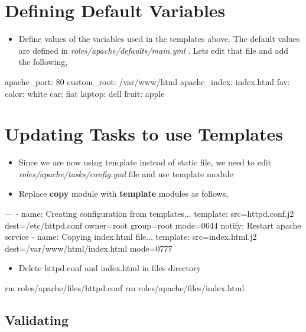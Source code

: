 \section{Defining Default Variables}

\begin{itemize}
\item Define values of the variables used in the templates above.  The default values are defined in \emph{roles/apache/defaults/main.yml} . Lets edit that file and add the following,
\end{itemize}

\begin{code}
apache_port: 80
custom_root: /var/www/html
apache_index: index.html
fav:
  color: white
  car: fiat
  laptop: dell
  fruit: apple
\end{code}

\section{Updating Tasks to use Templates}

\begin{itemize}
\item Since we are now using template instead of static file, we need to edit \emph{roles/apache/tasks/config.yml} file and use template module
\item Replace \textbf{copy} module with \textbf{template} modules as follows,
\end{itemize}

\begin{code}
---
- name: Creating configuration from templates...
  template: src=httpd.conf.j2
            dest=/etc/httpd.conf
            owner=root group=root mode=0644
  notify: Restart apache service
- name: Copying index.html file...
  template: src=index.html.j2
        dest=/var/www/html/index.html
        mode=0777
\end{code}

\begin{itemize}
\item Delete httpd.conf and index.html in files directory
\end{itemize}

\begin{code}
rm roles/apache/files/httpd.conf
rm roles/apache/files/index.html
\end{code}

\subsection{Validating}

